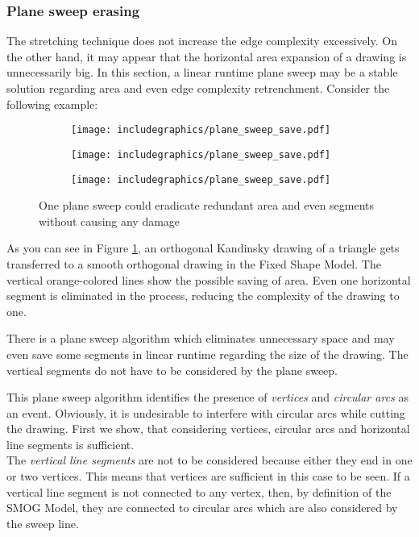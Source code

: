 \subsubsection*{Plane sweep erasing}
The stretching technique does not increase the edge complexity excessively. On the other hand, it may appear that the horizontal area expansion of a drawing is unnecessarily big. In this section, a linear runtime plane sweep may be a stable solution regarding area and even edge complexity retrenchment. Consider the following example:
\begin{figure}[H]
	\centering
	\begin{subfigure}{0.33\linewidth}
		\centering
		\texttt{[image: includegraphics/plane\_sweep\_save.pdf]}
		\caption{}
	\end{subfigure}	
	\begin{subfigure}{0.33\linewidth}
		\centering
		\texttt{[image: includegraphics/plane\_sweep\_save.pdf]}
		\caption{}
	\end{subfigure}
	\begin{subfigure}{0.32\linewidth}
		\centering
		\texttt{[image: includegraphics/plane\_sweep\_save.pdf]}
		\caption{}
	\end{subfigure}

	\caption{One plane sweep could eradicate redundant area and even segments without causing any damage}\label{im:sweep_save}
\end{figure}
As you can see in Figure \ref{im:sweep_save}, an orthogonal Kandinsky drawing of a triangle gets transferred to a smooth orthogonal drawing in the Fixed Shape Model. The vertical orange-colored lines show the possible saving of area. Even one horizontal segment is eliminated in the process, reducing the complexity of the drawing to one.
\begin{definition}
	There is a plane sweep algorithm which eliminates unnecessary space and may even save some segments in linear runtime regarding the size of the drawing. The vertical segments do not have to be considered by the plane sweep.
\end{definition}
This plane sweep algorithm identifies the presence of \textit{vertices} and \textit{circular arcs} as an event. Obviously, it is undesirable to interfere with circular arcs while cutting the drawing. First we show, that considering vertices, circular arcs and horizontal line segments is sufficient.\\
The \textit{vertical line segments} are not to be considered because either they end in one or two vertices. This means that vertices are sufficient in this case to be seen. If a vertical line segment is not connected to any vertex, then, by definition of the SMOG Model, they are connected to circular arcs which are also considered by the sweep line.\\
